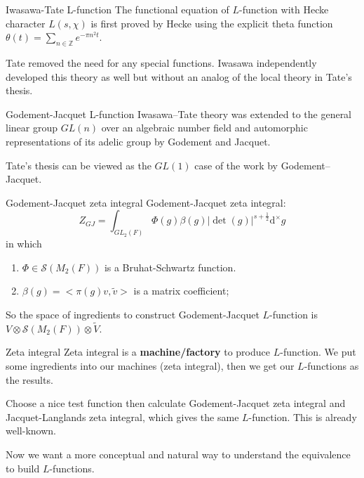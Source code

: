 \documentclass[aspectratio=169]{beamer}
\theoremstyle{plain}
\theoremstyle{definition}
\theoremstyle{remark}
\newcommand{\dif}{\text{d}}
\begin{document}
\begin{frame}{Iwasawa-Tate L-function}
    The functional equation of $L$-function with Hecke character $L(s,\chi)$ is first proved by Hecke using the explicit theta function $\theta(t)=\sum_{n\in\mathbb{Z}}e^{-\pi n^{2} t}$.
    
    \vspace{0.5cm}
    
    Tate removed the need for any special functions. Iwasawa independently developed this theory as well but without an analog of the local theory in Tate's thesis.
\end{frame}
\begin{frame}{Godement-Jacquet L-function}
Iwasawa–Tate theory was extended to the general linear group $GL(n)$ over an algebraic number field and automorphic representations of its adelic group by Godement and Jacquet. 

\vspace{0.5 cm}

Tate's thesis can be viewed as the $GL(1)$ case of the work by Godement–Jacquet.
\end{frame}
\begin{frame}{Godement-Jacquet zeta integral}
    Godement-Jacquet zeta integral:
    \begin{equation*}
        Z_{GJ}=\int_{GL_{2}(F)}\Phi(g)\beta(g)|\det(g)|^{s+\frac{1}{2}}\dif^{\times}g
    \end{equation*}
    in which 
    \begin{enumerate}
     \item $\Phi\in \mathcal{S}(M_{2}(F))$ is a Bruhat-Schwartz function. 
        \item $\beta(g)=<\pi(g)v,\tilde{v}>$ is a matrix coefficient;
       
    \end{enumerate}
    
    So the space of ingredients to construct Godement-Jacquet $L$-function is $V\otimes \mathcal{S}(M_{2}(F))\otimes \widetilde{V}$. 
\end{frame}
\begin{frame}{Zeta integral}
    Zeta integral is a \textbf{machine/factory} to produce $L$-function. We put some ingredients into our machines (zeta integral), then we get our $L$-functions as the  results. 
    
    \vspace{0.5 cm}
    
    Choose a nice test function then calculate Godement-Jacquet zeta integral and Jacquet-Langlands zeta integral, which gives the same $L$-function. This is already well-known.
    
    \vspace{0.5 cm}
    
    Now we want a more conceptual and natural way to understand the equivalence to build $L$-functions.
\end{frame}
\end{document}
